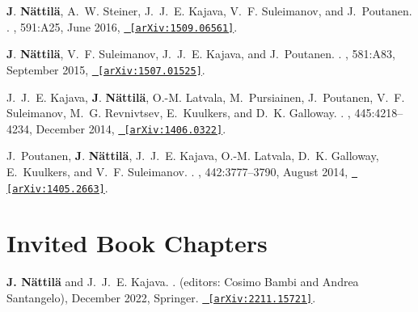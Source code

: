 \documentclass[letterpaper, onecolumn, 11pt]{article}
\begin{document}
\begin{thebibliography}{10}
\textbf{J}. \textbf{N{\"a}ttil{\"a}}, A.~W. {Steiner}, J.~J.~E. {Kajava}, V.~F.
  {Suleimanov}, and J.~{Poutanen}.
.
\newblock {\em \aap}, 591:A25, June 2016,
  \href{http://arxiv.org/abs/1509.06561}{\nolinkurl{ [arXiv:1509.06561]}}.

\textbf{J}. \textbf{N{\"a}ttil{\"a}}, V.~F. {Suleimanov}, J.~J.~E. {Kajava},
  and J.~{Poutanen}.
.
\newblock {\em \aap}, 581:A83, September 2015,
  \href{http://arxiv.org/abs/1507.01525}{\nolinkurl{ [arXiv:1507.01525]}}.

J.~J.~E. {Kajava}, \textbf{J}. \textbf{N{\"a}ttil{\"a}}, O.-M. {Latvala},
  M.~{Pursiainen}, J.~{Poutanen}, V.~F. {Suleimanov}, M.~G. {Revnivtsev},
  E.~{Kuulkers}, and D.~K. {Galloway}.
.
\newblock {\em \mnras}, 445:4218--4234, December 2014,
  \href{http://arxiv.org/abs/1406.0322}{\nolinkurl{ [arXiv:1406.0322]}}.

J.~{Poutanen}, \textbf{J}. \textbf{N{\"a}ttil{\"a}}, J.~J.~E. {Kajava}, O.-M.
  {Latvala}, D.~K. {Galloway}, E.~{Kuulkers}, and V.~F. {Suleimanov}.
.
\newblock {\em \mnras}, 442:3777--3790, August 2014,
  \href{http://arxiv.org/abs/1405.2663}{\nolinkurl{ [arXiv:1405.2663]}}.

\end{thebibliography}



\vspace{1cm}
\section*{Invited Book Chapters}
\vspace{-1cm}

%
\begin{thebibliography}{1}

\textbf{J. N\"attil\"a} and J.~J.~E. {Kajava}.
.
\newblock (editors: Cosimo Bambi and Andrea Santangelo), December 2022, Springer.
  \href{http://arxiv.org/abs/2211.15721}{\nolinkurl{ [arXiv:2211.15721]}}.

\end{thebibliography}
\end{document}
